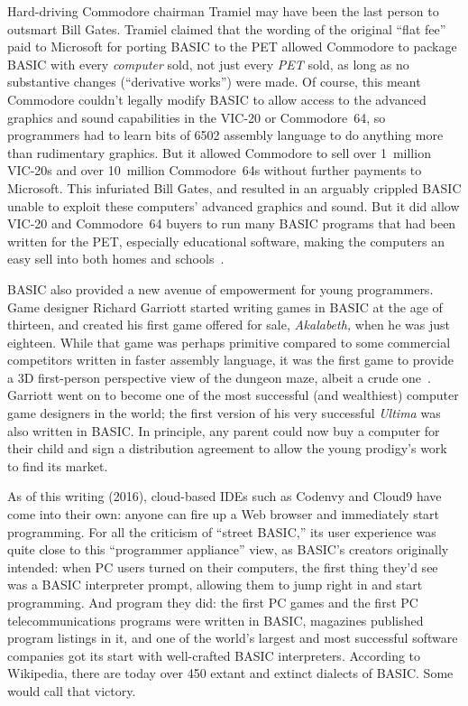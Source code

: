 \begin{tangent}
Hard-driving Commodore chairman Tramiel may have been the last person to
outsmart Bill Gates.
Tramiel claimed that the wording of the original ``flat fee'' paid to
Microsoft for porting BASIC to the PET allowed Commodore to package
BASIC with every \emph{computer} sold, not just every \emph{PET} sold,
as long as no substantive changes (``derivative works'') were made.
Of course, this meant Commodore couldn't legally modify BASIC to allow
access to the advanced graphics and sound capabilities in the VIC-20 or
Commodore~64, so programmers had to learn bits of 6502 assembly language
to do anything more than rudimentary graphics.
But it allowed Commodore to sell over 1~million VIC-20s and over
10~million Commodore~64s without further payments to Microsoft.
This infuriated Bill Gates, and resulted in an arguably crippled BASIC
unable to exploit these computers' advanced graphics and sound.
But it did allow VIC-20 and Commodore~64 buyers to run many BASIC
programs that had been written for the PET, especially educational
software, making the computers an easy sell into both homes and
schools~\cite[p. 414]{commodore}.
\end{tangent}

BASIC also provided a new avenue of empowerment for young programmers.
Game designer Richard Garriott started writing games in BASIC at the age
of thirteen, and created his first game offered for sale,
\emph{Akalabeth,} when he was just eighteen.
While that game was perhaps primitive compared to some commercial
competitors written in faster assembly language, it was the first game
to provide a 3D first-person perspective view of the dungeon maze,
albeit a crude one~\cite{akalabeth}.
Garriott went on to become one of the most successful (and
wealthiest) computer game designers in the world; the first version of
his very successful \emph{Ultima} was also written in BASIC.
In principle, any parent could now buy a computer for their child and
sign a distribution agreement to allow the young prodigy's work to
find its market.

As of this writing (2016), cloud-based IDEs such as Codenvy and Cloud9
have come into their own: anyone can fire up a Web browser and
immediately start programming.
For all the criticism of ``street BASIC,'' its user experience was quite
close to this ``programmer appliance'' view, as BASIC's creators
originally intended: when PC users turned on their computers, the first
thing they'd see was a BASIC interpreter prompt, allowing them to jump
right in and start programming.
And program they did: the first PC games and the first PC
telecommunications programs were written in BASIC, magazines published
program listings in it, and one of the world's largest and most
successful software companies got its start with well-crafted BASIC
interpreters.
According to Wikipedia, there are today over 450 extant and extinct
dialects of BASIC.
Some would call that victory.
